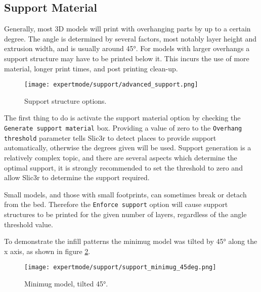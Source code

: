 \subsection{Support Material} %
\label{sec:support}

Generally, most 3D models will print with overhanging parts by up to a certain degree.  The angle is determined by several factors, most notably layer height and extrusion width, and is usually around 45°.  For models with larger overhangs a support structure may have to be printed below it.  This incurs the use of more material, longer print times, and post printing clean-up.

\begin{figure}[H]
\centering
\texttt{[image: expertmode/support/advanced\_support.png]}
\caption{Support structure options.}
\label{fig:advanced_support}
\end{figure}

The first thing to do is activate the support material option by checking the \texttt{Generate support material} box.  Providing a value of zero to the \texttt{Overhang threshold} parameter tells Slic3r to detect places to provide support automatically, otherwise the degrees given will be used.  Support generation is a relatively complex topic, and there are several aspects which determine the optimal support, it is strongly recommended to set the threshold to zero and allow Slic3r to determine the support required.

Small models, and those with small footprints, can sometimes break or detach from the bed.  Therefore the \texttt{Enforce support} option will cause support structures to be printed for the given number of layers, regardless of the angle threshold value.

To demonstrate the infill patterns the minimug model was tilted by 45° along the x axis, as shown in figure \ref{fig:support_minimug_45deg}.

\begin{figure}[H]
\centering
\texttt{[image: expertmode/support/support\_minimug\_45deg.png]}
\caption{Minimug model, tilted 45°.}
\label{fig:support_minimug_45deg}
\end{figure}

